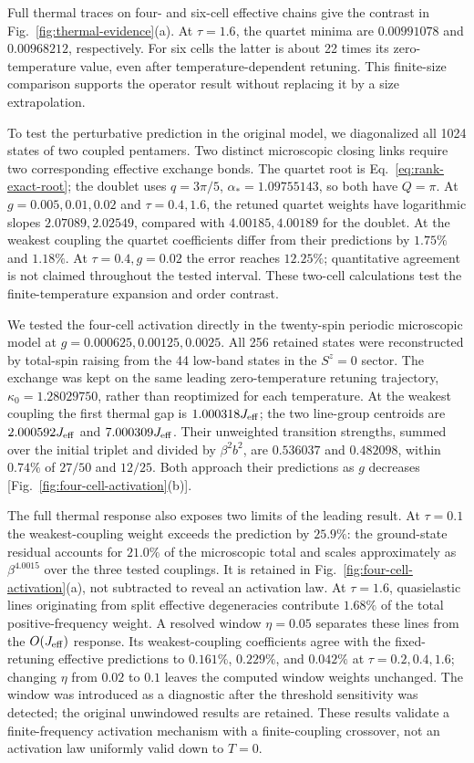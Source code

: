 Full thermal traces on four- and six-cell effective chains give the
contrast in Fig.~\ref{fig:thermal-evidence}(a). At $\tau=1.6$, the quartet
minima are $0.00991078$ and $0.00968212$, respectively. For six cells the
latter is about 22 times its zero-temperature value, even after
temperature-dependent retuning. This finite-size comparison supports the
operator result without replacing it by a size extrapolation.

To test the perturbative prediction in the original model, we diagonalized
all 1024 states of two coupled pentamers. Two distinct microscopic closing
links require two corresponding effective exchange bonds.
The quartet root is Eq.~\eqref{eq:rank-exact-root}; the doublet uses
$q=3\pi/5$, $\alpha_*=1.09755143$, so both have $Q=\pi$.
At $g=0.005,0.01,0.02$ and $\tau=0.4,1.6$, the retuned quartet
weights have logarithmic slopes $2.07089,2.02549$, compared with
$4.00185,4.00189$ for the doublet. At the weakest coupling the quartet
coefficients differ from their predictions by $1.75\%$ and $1.18\%$.
At $\tau=0.4,g=0.02$ the error reaches $12.25\%$; quantitative
agreement is not claimed throughout the tested interval. These two-cell
calculations test the finite-temperature expansion and order contrast.

We tested the four-cell activation directly in the twenty-spin periodic
microscopic model at $g=0.000625,0.00125,0.0025$. All 256 retained states
were reconstructed by total-spin raising from the 44 low-band states in
the $S^z=0$ sector. The exchange was kept on the same leading
zero-temperature retuning trajectory, $\kappa_0=1.28029750$, rather than
reoptimized for each temperature. At the weakest coupling the first
thermal gap is $1.000318J_{\rm eff}$; the two line-group centroids are
$2.000592J_{\rm eff}$ and $7.000309J_{\rm eff}$. Their unweighted
transition strengths, summed over the initial triplet and divided by
$\beta^2b^2$, are $0.536037$ and $0.482098$, within $0.74\%$ of
$27/50$ and $12/25$. Both approach their predictions as $g$ decreases
[Fig.~\ref{fig:four-cell-activation}(b)].

The full thermal response also exposes two limits of the leading result.
At $\tau=0.1$ the weakest-coupling weight exceeds the prediction by
$25.9\%$: the ground-state residual accounts for $21.0\%$ of the
microscopic total and scales approximately as $\beta^{4.0015}$ over the
three tested couplings. It is retained in
Fig.~\ref{fig:four-cell-activation}(a), not subtracted to reveal an
activation law. At $\tau=1.6$, quasielastic lines originating from split
effective degeneracies contribute $1.68\%$ of the total positive-frequency
weight. A resolved window $\eta=0.05$ separates these lines from the
$O(J_{\rm eff})$ response. Its weakest-coupling coefficients agree with
the fixed-retuning effective predictions to $0.161\%$, $0.229\%$, and
$0.042\%$ at $\tau=0.2,0.4,1.6$; changing $\eta$ from $0.02$ to
$0.1$ leaves the computed window weights unchanged. The window was
introduced as a diagnostic after the threshold sensitivity was detected;
the original unwindowed results are retained. These results validate a
finite-frequency activation mechanism with a finite-coupling crossover,
not an activation law uniformly valid down to $T=0$.

